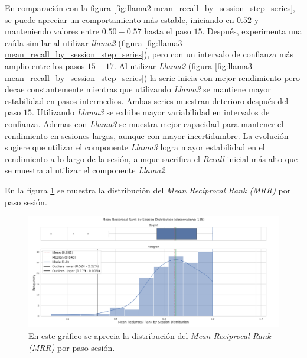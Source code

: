 \documentclass[11pt,a4paper,twoside]{thesis}
\begin{document}
En comparación con la figura \ref{fig:llama2-mean_recall_by_session_step_series}, se puede apreciar un comportamiento más estable, iniciando en $0.52$ y manteniendo valores entre $0.50-0.57$ hasta el paso $15$. Después, experimenta una caída similar al utilizar \textit{llama2} (figura \ref{fig:llama3-mean_recall_by_session_step_series}), pero con un intervalo de confianza más amplio entre los pasos $15-17$. Al utilizar \textit{Llama2} (figura \ref{fig:llama3-mean_recall_by_session_step_series}) la serie inicia con mejor rendimiento pero decae constantemente mientras que utilizando \textit{Llama3} se mantiene mayor estabilidad en pasos intermedios. Ambas series muestran deterioro después del paso $15$. Utilizando \textit{Llama3} se exhibe mayor variabilidad en intervalos de confianza. Ademas con \textit{Llama3} se muestra mejor capacidad para mantener el rendimiento en sesiones largas, aunque con mayor incertidumbre. La evolución sugiere que utilizar el componente \textit{Llama3} logra mayor estabilidad en el rendimiento a lo largo de la sesión, aunque sacrifica el \textit{Recall} inicial más alto que se muestra al utilizar el componente \textit{Llama2}.

\clearpage

En la figura \ref{fig:llama3-mean_reciprocal_rank_by_session_distribution} se muestra la distribución del \textit{Mean Reciprocal Rank (MRR)} por paso sesión.

\begin{figure}[H]
	\centering
	\includegraphics[width=15cm]{./images/llama3/mean_reciprocal_rank_by_session_distribution.png}
	\caption{En este gráfico se aprecia la distribución del \textit{Mean Reciprocal Rank (MRR)} por paso sesión.}
	\label{fig:llama3-mean_reciprocal_rank_by_session_distribution}
\end{figure}
\end{document}
